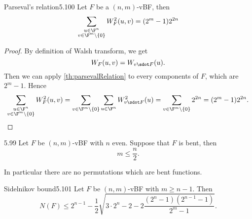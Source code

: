 \begin{defn}{Parseval's relation}{5.100}
	Let \(F\) be a \((n,m)\)-vBF, then
	\[
		\sum_{\substack{u\in\F^n\\v\in\F^m\setminus\{0\}}} W_F^2(u,v) = (2^m-1)2^{2n}
	\]
\end{defn}

\begin{proof}
	By definition of Walsh transform, we get
	\[
		W_F(u,v) = W_{v\sdot F}(u).
	\]
	Then we can apply \autoref{th:parsevalRelation} to every components of \(F\), which are \(2^m-1\). Hence
	\[
		\sum_{\substack{u\in\F^n\\v\in\F^m\setminus\{0\}}} W_F^2(u,v) = \sum_{v\in\F^m\setminus\{0\}}\sum_{u\in\F^n} W_{v\sdot F}^2(u) = \sum_{v \in \F^m\setminus\{0\}} 2^{2n} = (2^m-1)2^{2n}.\qedhere
	\]
\end{proof}

\begin{teor}{}{5.99}
	Let \(F\) be \((n,m)\)-vBF with \(n\) even. Suppose that \(F\) is bent, then
	\[
		m \le \frac{n}{2}.
	\]
\end{teor}

\begin{oss}
	In particular there are no permutations which are bent functions.
\end{oss}

\begin{teor}{Sidelnikov bound}{5.101}
	Let \(F\) be \((n,m)\)-vBF with \(m\ge n-1\). Then
	\[
		N(F) \le 2^{n-1} - \frac{1}{2}\sqrt{3\cdot 2^n - 2 - 2 \frac{(2^n-1)(2^{n-1}-1)}{2^m-1}}.
	\]
\end{teor}

